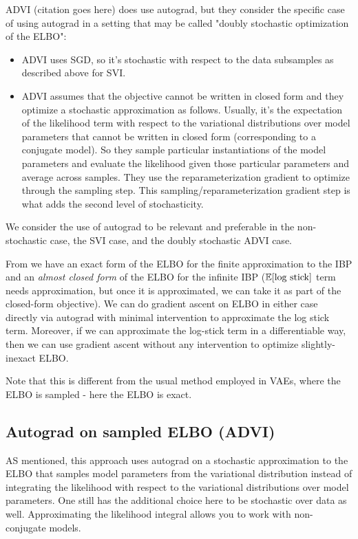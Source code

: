 \documentclass[a4paper, 11pt]{article}
\begin{document}
ADVI (citation goes here) does use autograd, but they consider the specific case of using autograd in a setting that may be called "doubly stochastic optimization of the ELBO":
\begin{itemize}
    \item ADVI uses SGD, so it's stochastic with respect to the data subsamples as described above for SVI.

    \item ADVI assumes that the objective cannot be written in closed form and they optimize a stochastic approximation as follows. Usually, it's the expectation of the likelihood term with respect to the variational distributions over model parameters that cannot be written in closed form (corresponding to a conjugate model). So they sample particular instantiations of the model parameters and evaluate the likelihood given those particular parameters and average across samples. They use the reparameterization gradient to optimize through the sampling step.
    This sampling/reparameterization gradient step is what adds the second level of stochasticity. 
\end{itemize}

We consider the use of autograd to be relevant and preferable in
the non-stochastic case, the SVI case, and the doubly stochastic ADVI case.

\medskip

From \citet{doshi2009report} we have an exact form of the ELBO for the finite approximation to the IBP and an \textit{almost closed form} of the ELBO for the infinite IBP ($\mathbb{E}[\text{log stick}]$ term needs approximation, but once it is approximated, we can take it as part of the closed-form
objective). We can do gradient ascent on ELBO in either case directly via autograd with minimal intervention to approximate the log stick term. Moreover, if we can approximate the log-stick term in a differentiable way, then we can use gradient ascent without any intervention to optimize slightly-inexact ELBO.


\medskip

Note that this is different from the usual method employed in VAEs, where the ELBO is sampled - here the ELBO is exact.

\subsection{Autograd on sampled ELBO (ADVI)}

AS mentioned, this approach uses autograd on a stochastic approximation to the ELBO that samples model parameters from the variational distribution instead of integrating the likelihood with respect to the variational distributions over model parameters. One still has the additional choice here to be stochastic over data as well. Approximating the likelihood integral allows you to work with non-conjugate models.
\end{document}
